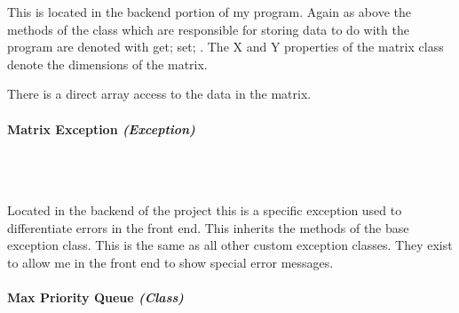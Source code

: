 \begin{FlushLeft}
    This is located in the backend portion of my program. Again as above the methods of the class which are responsible for storing data to do with the program are denoted with { get; set; }. The X and Y properties of the matrix class denote the dimensions of the matrix. \\ \bk
    
    There is a direct array access to the data in the matrix.


    \bk

    \paragraph{Matrix Exception \textit{(Exception)}} \mbox{} \\

    \begin{figure}[H]
        \centering
    \end{figure}\\
    Located in the backend of the project this is a specific exception used to differentiate errors in the front end. This inherits the methods of the base exception class. This is the same as all other custom exception classes. They exist to allow me in the front end to show special error messages.
    \bk


    \paragraph{Max Priority Queue \textit{(Class)}} \mbox{} \\


\end{FlushLeft}
